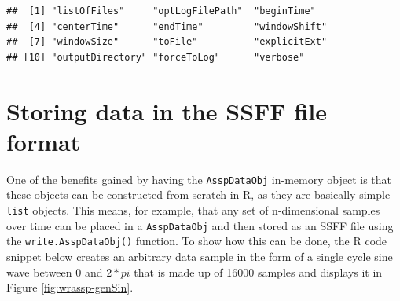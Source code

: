 \documentclass[]{book}
\newenvironment{Shaded}{\begin{snugshade}}{\end{snugshade}}
\newcommand{\CommentTok}[1]{\textcolor[rgb]{0.56,0.35,0.01}{\textit{#1}}}
\newcommand{\DataTypeTok}[1]{\textcolor[rgb]{0.13,0.29,0.53}{#1}}
\newcommand{\DecValTok}[1]{\textcolor[rgb]{0.00,0.00,0.81}{#1}}
\newcommand{\KeywordTok}[1]{\textcolor[rgb]{0.13,0.29,0.53}{\textbf{#1}}}
\newcommand{\NormalTok}[1]{#1}
\newcommand{\OperatorTok}[1]{\textcolor[rgb]{0.81,0.36,0.00}{\textbf{#1}}}
\newcommand{\OtherTok}[1]{\textcolor[rgb]{0.56,0.35,0.01}{#1}}
\newcommand{\StringTok}[1]{\textcolor[rgb]{0.31,0.60,0.02}{#1}}
\begin{document}
\begin{verbatim}
##  [1] "listOfFiles"     "optLogFilePath"  "beginTime"      
##  [4] "centerTime"      "endTime"         "windowShift"    
##  [7] "windowSize"      "toFile"          "explicitExt"    
## [10] "outputDirectory" "forceToLog"      "verbose"
\end{verbatim}

\begin{Shaded}
\end{Shaded}

\hypertarget{sec:wrassp_genSSFF}{%
\section{Storing data in the SSFF file format}\label{sec:wrassp_genSSFF}}

One of the benefits gained by having the \texttt{AsspDataObj} in-memory object is that these objects can be constructed from scratch in R, as they are basically simple \texttt{list} objects. This means, for example, that any set of n-dimensional samples over time can be placed in a \texttt{AsspDataObj} and then stored as an SSFF file using the \texttt{write.AsspDataObj()} function. To show how this can be done, the R code snippet below creates an arbitrary data sample in the form of a single cycle sine wave between \(0\) and \(2*pi\) that is made up of 16000 samples and displays it in Figure \ref{fig:wrassp-genSin}.
\end{document}
